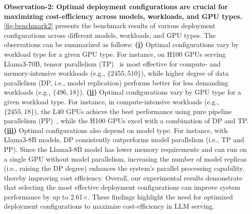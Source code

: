 \textbf{Observation-2: Optimal deployment configurations are crucial for maximizing cost-efficiency across models, workloads, and GPU types.} \autoref{fig:benchmark2} presents the benchmark results of various deployment configurations across different models, workloads, and GPU types. The observations can be summarized as follows:
\textbf{(\underline{i})} Optimal configurations vary by workload type for a given GPU type. 
For instance, on H100 GPUs serving Llama3-70B, tensor parallelism (TP)~\cite{shoeybi2019megatron} is most effective for compute- and memory-intensive workloads (e.g., $\{2455, 510\}$), while higher degree of data parallelism (DP, i.e., model replication) performs better for less demanding workloads (e.g., $\{496, 18\}$).
\textbf{(\underline{ii})} Optimal configurations vary by GPU type for a given workload type. For instance, in compute-intensive workloads (e.g., $\{2455, 18\}$), the L40 GPUs achieve the best performance using pure pipeline parallelism (PP)~\cite{huang2019gpipe}, while the H100 GPUs excel with a combination of DP and TP.
\textbf{(\underline{iii})} Optimal configurations also depend on model type. For instance, with Llama3-8B models, DP consistently outperforms model parallelism (i.e., TP and PP). 
Since the Llama3-8B model has lower memory requirements and can run on a single GPU without model parallelism, increasing the number of model replicas (i.e., raising the DP degree) enhances the system's parallel processing capability, thereby improving cost efficiency.
Overall, our experimental results demonstrate that selecting the most effective deployment configurations can improve system performance by up to 2.61$\times$. These findings highlight the need for optimized deployment configurations to maximize cost-efficiency in LLM serving.

